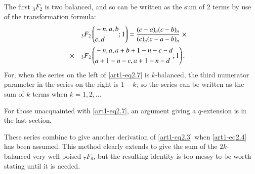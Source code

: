 The first ${}_3 F_2$ is two balanced, and so can be written as the sum of 2 terms by use of the transformation formula: 
\begin{align}
&{}_3 F_2 
\left( 
\begin{aligned}
& -n , a, b\\
& c, d
\end{aligned} ; 1
\right) = \frac{(c-a)_n (c-b)_n}{(c)_n (c-a-b)_n} \; \times\label{art1-eq2.7} \\
\times\quad  & {}_3 F_2 
\left(\begin{aligned}
& -n, a , a + b+1-n - c -d\\
& a+1-n-c, a+1-n-d
\end{aligned};1
\right) . \notag
\end{align}
For, when the series on the left of \eqref{art1-eq2.7} is $k$-balanced, the third numerator parameter in the series on the right is $1-k$; so the series can be written as the sum of $k$ terms when $k=1,2,\ldots$

For those unacquainted with \eqref{art1-eq2.7}, an argument giving a $q$-extension is in the last section.

These series combine to give another derivation of \eqref{art1-eq2.3} when \eqref{art1-eq2.4} has been assumed. This method clearly extends to give the sum of the $2k$-balanced very well poised ${}_7 F_6$, but the resulting identity is too messy to be worth stating until it is needed.

